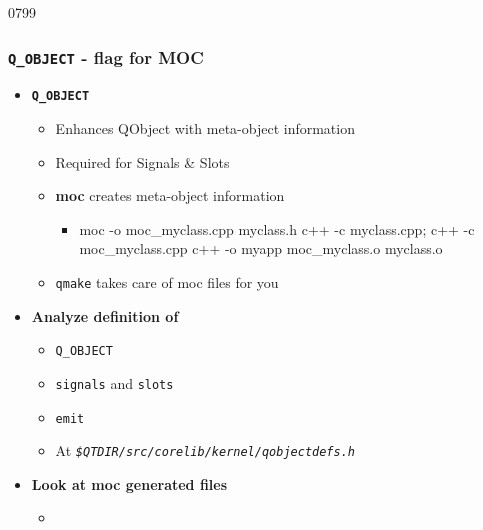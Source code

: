 \begin{slide}[fragile]{0799}\frametitle{\texttt{Q\_OBJECT} - flag for MOC}
\begin{itemize}
\item \textbf{\texttt{Q\_OBJECT}}
  \begin{itemize}
  \item Enhances QObject with meta-object information
  \item Required for Signals \& Slots
  \item \textbf{moc} creates meta-object information
    \begin{itemize}
    \item[] \begin{shell}
moc -o moc_myclass.cpp myclass.h
c++ -c myclass.cpp; c++ -c moc_myclass.cpp
c++ -o myapp moc_myclass.o myclass.o
    \end{shell}
   \end{itemize}
 \item \texttt{qmake} takes care of moc files for you
 \end{itemize}
\item \textbf{Analyze definition of} 
  \begin{itemize}
  \item \texttt{Q\_OBJECT}
  \item \texttt{signals} and \texttt{slots}
  \item \texttt{emit}
  \item At \textit{\texttt{\$QTDIR/src/corelib/kernel/qobjectdefs.h}}
  \end{itemize}        
\item \textbf{Look at moc generated files}
  \begin{itemize}
  \item {}
  \end{itemize} 
\end{itemize}

\end{slide}

